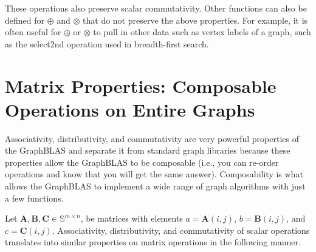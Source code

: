 These operations also preserve scalar commutativity. Other functions can also be defined for $\oplus$ and $\otimes$ that do not preserve the above properties.  For example, it is often useful for $\oplus$ or $\otimes$ to pull in other data such as vertex labels of a graph, such as the select2nd operation used in breadth-first search. 

\section{Matrix Properties: Composable Operations on Entire Graphs}
  Associativity, distributivity, and commutativity are very powerful properties of the GraphBLAS and separate it from standard graph libraries because these properties allow the GraphBLAS to be composable (i.e., you can re-order operations and know that you will get the same answer).  Composability is what allows the GraphBLAS to implement a wide range of graph algorithms with just a few functions.

  Let $\mathbf{A}, \mathbf{B}, \mathbf{C} \in \mathbb{S}^{m \times n}$, be matrices with elements $a = \mathbf{A}(i,j)$, $b = \mathbf{B}(i,j)$, and $c = \mathbf{C}(i,j)$.  Associativity, distributivity, and commutativity of scalar operations translates into similar properties on matrix operations in the following manner.

